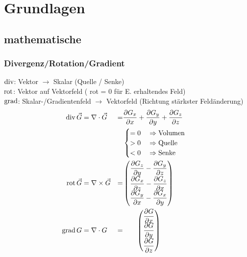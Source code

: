 \section{Grundlagen}
\subsection{mathematische}
\subsubsection*{Divergenz/Rotation/Gradient}

$\operatorname{div}$: Vektor $\rightarrow$ Skalar (Quelle / Senke)\\
$\operatorname{rot}$: Vektor auf Vektorfeld ( rot = 0 für E. erhaltendes Feld)\\
$\operatorname{grad}$: Skalar-/Gradientenfeld $\rightarrow$ Vektorfeld (Richtung stärkster Feldänderung)
\begin{align*}
    \operatorname{div} \vec{G} & = \nabla \cdot \vec{G}  & = & \dfrac{\partial G_x}{\partial x} + \dfrac{\partial G_y}{\partial y} + \dfrac{\partial G_z}{\partial z} \\
                   &                         &   & \begin{cases}
        = 0 \quad\Rightarrow \textnormal{Volumen} \\
        > 0 \quad\Rightarrow \textnormal{Quelle}  \\
        < 0 \quad\Rightarrow \textnormal{Senke}
    \end{cases}                                                                              \\
    \operatorname{rot} \vec{G} & = \nabla \times \vec{G} & = &
    \begin{pmatrix}
        \dfrac{\partial G_z}{\partial y} - \dfrac{\partial G_y}{\partial z} \\
        \dfrac{\partial G_x}{\partial z} - \dfrac{\partial G_z}{\partial x} \\
        \dfrac{\partial G_y}{\partial x} - \dfrac{\partial G_x}{\partial y}
    \end{pmatrix}                                                                                                                             \\
    \operatorname{grad} G      & = \nabla \cdot G        & = & \hspace{4.5ex}
    \begin{pmatrix}
        \dfrac{\partial G}{\partial x} \\
        \dfrac{\partial G}{\partial y} \\
        \dfrac{\partial G}{\partial z}
    \end{pmatrix}
\end{align*}


